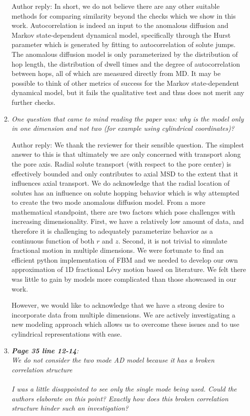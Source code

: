 \documentclass{article}
\begin{document}
\begin{enumerate}[label={Comment \theenumi :}, leftmargin=3.9\parindent]
		Author reply: In short, we do not believe there are any other suitable methods for comparing
		similarity beyond the checks which we show in this work. Autocorrelation is indeed an input 
		to the anomalous diffusion and Markov state-dependent dynamical model, specifically through
		the Hurst parameter which is generated by fitting to autocorrelation of solute jumps. The
		anomalous diffusion model is only parameterized by the distribution of hop length, the 
		distribution of dwell times and the degree of autocorrelation between hops, all of which
		are measured directly from MD. It may be possible to think of other metrics of success
		for the Markov state-dependent dynamical model, but it fails the qualitative test and
		thus does not merit any further checks.
		
  \item \textit{One question that came to mind reading the paper was: why is the model only in 
  		one dimension and not two (for example using cylindrical coordinates)?}
  		
  		Author reply: We thank the reviewer for their sensible question. The simplest answer
  		to this is that ultimately we are only concerned with transport along the pore axis. Radial
  		solute transport (with respect to the pore center) is effectively bounded and only 
  		contributes to axial MSD to the extent that it influences axial transport. We 
  		do acknowledge that the radial location of solutes has an influence on solute
  		hopping behavior which is why attempted to create the two mode anomalous diffusion model.
		From a more mathematical standpoint, there are two factors which pose challenges with
		increasing dimensionality. First, we have a relatively low amount of data, and therefore
		it is challenging to adequately parameterize behavior as a continuous function of both 
		$r$ and $z$. Second, it is not trivial to simulate fractional motion in multiple dimensions.
		We were fortunate to find an efficient python implementation of FBM and we needed to
		develop our own approximation of 1D fractional L\'{e}vy motion based on literature. 
		We felt there was little to gain by models more complicated than those showcased in our
		work.
		
		However, we would like to acknowledge that we have a strong desire to incorporate data
		from multiple dimensions. We are actively investigating a new modeling approach which 
		allows us to overcome these issues and to use cylindrical representations with ease.

  \item \textit{\textbf{Page 35 line 12-14}: \\
   		We do not consider the two mode AD model because it has a broken correlation structure \\ \\
        I was a little disappointed to see only the single mode being used. Could the authors 
        elaborate on this point? Exactly how does this broken correlation structure hinder such
        an investigation?}
        

\end{enumerate}
\end{document}
